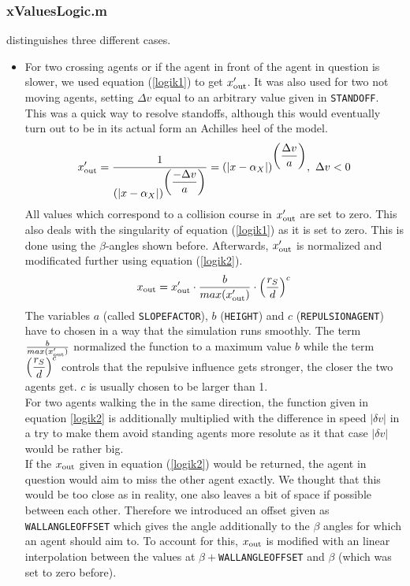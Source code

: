 \subsubsection{xValuesLogic.m}
 distinguishes three different cases.
\begin{itemize}
	\item For two crossing agents or if the agent in front of the agent in question is slower, we used equation (\ref{logik1}) to get $x_{\text{out}}'$. It was also used for two not moving agents, setting $\Delta v$ equal to an arbitrary value given in \texttt{STANDOFF}. This was a quick way to resolve standoffs, although this would eventually turn out to be in its actual form an Achilles heel of the model.
	\begin{equation}\label{logik1}
		x_{\text{out}}' = \frac{1}{\displaystyle (|x - \alpha_X|)^{\displaystyle \left(\frac{-\Delta v}{a}\right)}} = (|x - \alpha_X|)^{\displaystyle \left(\frac{\Delta v}{a}\right)},\ \Delta v < 0
	\end{equation}
	\noi All values which correspond to a collision course in $x_{\text{out}}'$ are set to zero. This also deals with the singularity of equation (\ref{logik1}) as it is set to zero. This is done using the $\beta$-angles shown before. Afterwards, $x_{\text{out}}'$ is normalized and modificated further using equation (\ref{logik2}).
	\begin{equation}\label{logik2}
		x_{\text{out}} = x_{\text{out}}' \cdot \frac{b}{max(x_{\text{out}}')} \cdot \displaystyle \left(\frac{r_S}{d}\right)^c
	\end{equation}
	\noi The variables $a$ (called \texttt{SLOPEFACTOR}), $b$ (\texttt{HEIGHT}) and $c$ (\texttt{REPULSIONAGENT}) have to chosen in a way that the simulation runs smoothly. The term $\frac{b}{max(x_{\text{out}}')}$ normalized the function to a maximum value $b$ while the term $\displaystyle \left(\frac{r_S}{d}\right)^c$ controls that the repulsive influence gets stronger, the closer the two agents get. $c$ is usually chosen to be larger than 1.\\
	For two agents walking the in the same direction, the function given in equation \ref{logik2} is additionally multiplied with the difference in speed $|\delta v|$ in a try to make them avoid standing agents more resolute as it that case $|\delta v|$ would be rather big.\\
	
	\noi If the $x_{\text{out}}$ given in equation (\ref{logik2}) would be returned, the agent in question would aim to miss the other agent exactly. We thought that this would be too close as in reality, one also leaves a bit of space if possible between each other. Therefore we introduced an offset given as \texttt{WALLANGLEOFFSET} which gives the angle additionally to the $\beta$ angles for which an agent should aim to. To account for this, $x_{\text{out}}$ is modified with an linear interpolation between the values at $\beta + $\texttt{WALLANGLEOFFSET} and $\beta$ (which was set to zero before).


\end{itemize}
